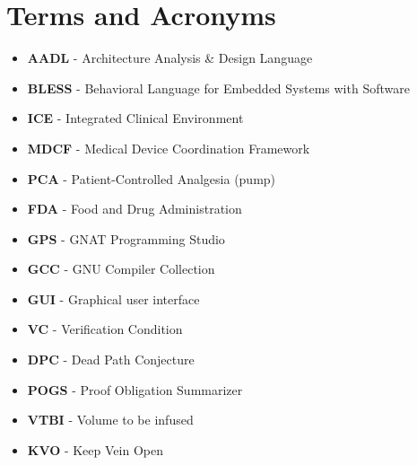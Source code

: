 \section{Terms and Acronyms}
\label{introduction:terms}

\begin{itemize}
	\item \textbf{AADL} - Architecture Analysis \& Design Language
	\item \textbf{BLESS} - Behavioral Language for Embedded Systems with Software
	\item \textbf{ICE} - Integrated Clinical Environment
	\item \textbf{MDCF} - Medical Device Coordination Framework
	\item \textbf{PCA} - Patient-Controlled Analgesia (pump)
	\item \textbf{FDA} - Food and Drug Administration
	\item \textbf{GPS} - GNAT Programming Studio
	\item \textbf{GCC} - GNU Compiler Collection
	\item \textbf{GUI} - Graphical user interface
	\item \textbf{VC} - Verification Condition
	\item \textbf{DPC} - Dead Path Conjecture
	\item \textbf{POGS} - Proof Obligation Summarizer
	\item \textbf{VTBI} - Volume to be infused
	\item \textbf{KVO} - Keep Vein Open
\end{itemize}